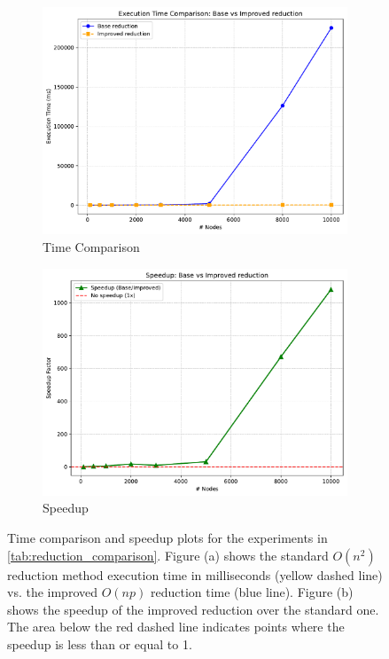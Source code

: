 \begin{figure}[H]
    \centering
    \begin{subfigure}[b]{0.48\textwidth}
        \centering
        \includegraphics[width=\textwidth]{"Immagini/execution_time_comparison_reduction.pdf"}
        \caption{Time Comparison}
        \label{fig:time_comparison_red}
    \end{subfigure}
    \hfill %
    \begin{subfigure}[b]{0.48\textwidth}
        \centering
        \includegraphics[width=\textwidth]{"Immagini/speedup_comparison_reduction.pdf"}
        \caption{Speedup}
        \label{fig:speedup_red}
    \end{subfigure}
    \caption{Time comparison and speedup plots for the experiments in \cref{tab:reduction_comparison}. Figure (a) shows the standard $O(n^2)$ reduction method execution time in milliseconds (yellow dashed line) vs. the improved $O(np)$ reduction time (blue line). Figure (b) shows the speedup of the improved reduction over the standard one. The area below the red dashed line indicates points where the speedup is less than or equal to 1.}
    \label{fig:cs_time_exp_plots}
\end{figure}